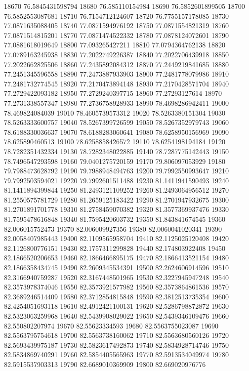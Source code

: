 {18670 76.5845431598794
18680 76.585110154984
18690 76.5852601899505
18700 76.5852553087681
18710 76.7154712124607
18720 76.7755157178085
18730 77.0871635088405
18740 77.0871594976192
18750 77.0871554821319
18760 77.0871514815201
18770 77.0871474522332
18780 77.0878124072601
18790 77.0881618019649
18800 77.093265427211
18810 77.0794364762138
18820 77.0789163245938
18830 77.2022749226387
18840 77.2022706439918
18850 77.2022662825506
18860 77.2435892084312
18870 77.2449219841685
18880 77.2451345596558
18890 77.2473887933903
18900 77.2481778079986
18910 77.2481732774545
18920 77.2170473894148
18930 77.2170428571704
18940 77.2729422093182
18950 77.2729240397715
18960 77.27293127614
18970 77.2731338557347
18980 77.2736758928933
18990 78.4698286942411
19000 78.469824084039
19010 78.4605739573312
19020 78.5263380151304
19030 78.5263333600757
19040 78.5267399726599
19050 78.5267352979743
19060 78.6188330036637
19070 78.6188283060641
19080 78.6258950156969
19090 78.625890460513
19100 78.6258858426572
19110 78.6254198194184
19120 78.7282351432334
19130 78.7282348022885
19140 78.7287775142443
19150 78.7496547293598
19160 79.0401275720159
19170 79.806097053929
19180 79.7988473628792
19190 79.7988948494763
19200 79.7992550993647
19210 79.7992503594021
19220 79.7992601511488
19230 81.1411941590493
19240 81.1411894399844
19250 81.2493121109252
19260 81.2493064956512
19270 81.2550575781729
19280 81.2659125183422
19290 81.2701947932675
19300 81.2701891701778
19310 81.2758459070382
19320 81.3577369937476
19330 81.7595478616848
19340 81.7595420603732
19350 81.843841674545
19360 82.006015752473
19370 82.006009927356
19380 82.0060041020341
19390 82.0058407985443
19400 82.1109565958704
19410 82.1125025120408
19420 82.1126800776151
19430 82.1757311299828
19440 82.174803922408
19450 82.1866520206653
19460 82.1866466895175
19470 82.1866413521154
19480 82.1866358434745
19490 82.2609345534391
19500 82.2624606914596
19510 82.3166940759287
19520 82.3167448501965
19530 82.3227945947248
19540 82.3573978374046
19550 82.3573921577982
19560 82.3573864861536
19570 82.3689246514409
19580 82.3712854815848
19590 82.3812513735354
19600 82.4254051693118
19610 82.4912421100131
19620 82.5286798872872
19630 82.5323063259968
19640 82.5439908029022
19650 82.5439346109476
19660 82.550802207974
19670 82.55623334593
19680 82.5563755023087
19690 82.5563795754618
19700 82.5563738160062
19710 82.5563680560126
19720 82.5693439975187
19730 82.5823617492873
19740 82.5834928714746
19750 82.5834869740291
19760 82.5854405565963
19770 82.5913534049974
19780 82.5915537903313
19790 82.6689010369909
19800 82.669020976776
}
